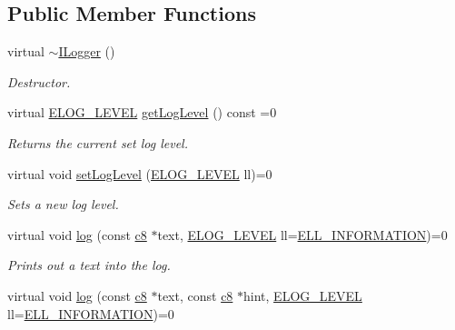 \subsection*{Public Member Functions}
\begin{DoxyCompactItemize}
\item 
\mbox{\label{classirr_1_1ILogger_ae1ceda88c9b97cc1efcefa38588f9116}} 
virtual \hyperlink{classirr_1_1ILogger_ae1ceda88c9b97cc1efcefa38588f9116}{$\sim$\+I\+Logger} ()
\begin{DoxyCompactList}\small\item\em Destructor. \end{DoxyCompactList}\item 
\mbox{\label{classirr_1_1ILogger_af32c91dd813853eb0d72c10b5d774b93}} 
virtual \hyperlink{namespaceirr_aa2d1cac68606a25ed24cfffccfa30a92}{E\+L\+O\+G\+\_\+\+L\+E\+V\+EL} \hyperlink{classirr_1_1ILogger_af32c91dd813853eb0d72c10b5d774b93}{get\+Log\+Level} () const =0
\begin{DoxyCompactList}\small\item\em Returns the current set log level. \end{DoxyCompactList}\item 
virtual void \hyperlink{classirr_1_1ILogger_a226a6f71f76970f2d846a10599f2e5ec}{set\+Log\+Level} (\hyperlink{namespaceirr_aa2d1cac68606a25ed24cfffccfa30a92}{E\+L\+O\+G\+\_\+\+L\+E\+V\+EL} ll)=0
\begin{DoxyCompactList}\small\item\em Sets a new log level. \end{DoxyCompactList}\item 
virtual void \hyperlink{classirr_1_1ILogger_acbbc214a06cd968409000f55aa76c82f}{log} (const \hyperlink{namespaceirr_a9395eaea339bcb546b319e9c96bf7410}{c8} $\ast$text, \hyperlink{namespaceirr_aa2d1cac68606a25ed24cfffccfa30a92}{E\+L\+O\+G\+\_\+\+L\+E\+V\+EL} ll=\hyperlink{namespaceirr_aa2d1cac68606a25ed24cfffccfa30a92aaed3e0f449ad8851a1bb501d4df1c0e7}{E\+L\+L\+\_\+\+I\+N\+F\+O\+R\+M\+A\+T\+I\+ON})=0
\begin{DoxyCompactList}\small\item\em Prints out a text into the log. \end{DoxyCompactList}\item 
virtual void \hyperlink{classirr_1_1ILogger_afccb7b2bb0a9b0415204d63e2b0cf290}{log} (const \hyperlink{namespaceirr_a9395eaea339bcb546b319e9c96bf7410}{c8} $\ast$text, const \hyperlink{namespaceirr_a9395eaea339bcb546b319e9c96bf7410}{c8} $\ast$hint, \hyperlink{namespaceirr_aa2d1cac68606a25ed24cfffccfa30a92}{E\+L\+O\+G\+\_\+\+L\+E\+V\+EL} ll=\hyperlink{namespaceirr_aa2d1cac68606a25ed24cfffccfa30a92aaed3e0f449ad8851a1bb501d4df1c0e7}{E\+L\+L\+\_\+\+I\+N\+F\+O\+R\+M\+A\+T\+I\+ON})=0

\end{DoxyCompactItemize}
